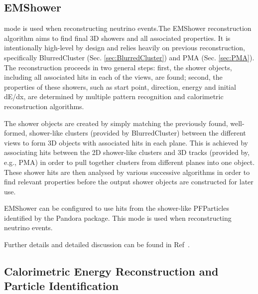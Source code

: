 \subsection{EMShower}\label{sec:EMShower}

mode is used when reconstructing neutrino events.The EMShower reconstruction algorithm aims to find final 3D showers and all associated properties.  It is intentionally high-level by design and relies heavily on previous reconstruction, specifically BlurredCluster (Sec. \ref{sec:BlurredCluster}) and PMA (Sec. \ref{sec:PMA}).  The reconstruction proceeds in two general steps: first, the shower objects, including all associated hits in each of the views, are found; second, the properties of these showers, such as start point, direction, energy and initial dE/dx, are determined by multiple pattern recognition and calorimetric reconstruction algorithms.

The shower objects are created by simply matching the previously found, well-formed, shower-like clusters (provided by BlurredCluster) between the different views to form 3D objects with associated hits in each plane.  This is achieved by associating hits between the 2D shower-like clusters and 3D tracks (provided by, e.g., PMA) in order to pull together clusters from different planes into one object.  These shower hits are then analysed by various successive algorithms in order to find relevant properties before the output shower objects are constructed for later use.

EMShower can be configured to use hits from the shower-like PFParticles identified by the Pandora package. This mode is used when reconstructing neutrino events.

Further details and detailed discussion can be found in Ref~\cite{ref:emshower}.


\subsection{Calorimetric Energy Reconstruction and Particle Identification}

